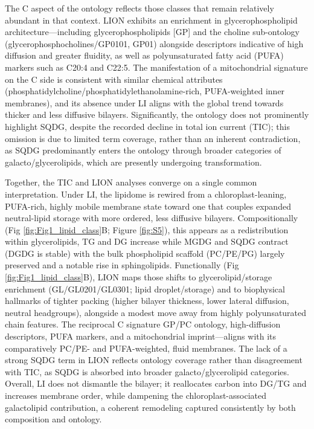 \documentclass[10pt,letterpaper]{article}
\begin{document}
The C aspect of the ontology reflects those classes that remain relatively abundant in that context. LION exhibits an enrichment in glycerophospholipid architecture—including glycerophospholipids [GP] and the choline sub-ontology (glycerophosphocholines/GP0101, GP01) alongside descriptors indicative of high diffusion and greater fluidity, as well as polyunsaturated fatty acid (PUFA) markers such as C20:4 and C22:5. The manifestation of a mitochondrial signature on the C side is consistent with similar chemical attributes (phosphatidylcholine/phosphatidylethanolamine-rich, PUFA-weighted inner membranes), and its absence under LI aligns with the global trend towards thicker and less diffusive bilayers. Significantly, the ontology does not prominently highlight SQDG, despite the recorded decline in total ion current (TIC); this omission is due to limited term coverage, rather than an inherent contradiction, as SQDG predominantly enters the ontology through broader categories of galacto/glycerolipids, which are presently undergoing transformation.

Together, the TIC and LION analyses converge on a single common interpretation. Under LI, the lipidome is rewired from a chloroplast-leaning, PUFA-rich, highly mobile membrane state toward one that couples expanded neutral-lipid storage with more ordered, less diffusive bilayers. Compositionally (Fig \ref{fig:Fig1_lipid_class}B; Figure \ref{fig:S5}), this appears as a redistribution within glycerolipids, TG and DG increase while MGDG and SQDG contract (DGDG is stable) with the bulk phospholipid scaffold (PC/PE/PG) largely preserved and a notable rise in sphingolipids. Functionally (Fig \ref{fig:Fig1_lipid_class}B), LION maps those shifts to glycerolipid/storage enrichment (GL/GL0201/GL0301; lipid droplet/storage) and to biophysical hallmarks of tighter packing (higher bilayer thickness, lower lateral diffusion, neutral headgroups), alongside a modest move away from highly polyunsaturated chain features. The reciprocal C signature GP/PC ontology, high-diffusion descriptors, PUFA markers, and a mitochondrial imprint—aligns with its comparatively PC/PE- and PUFA-weighted, fluid membranes. The lack of a strong SQDG term in LION reflects ontology coverage rather than disagreement with TIC, as SQDG is absorbed into broader galacto/glycerolipid categories. Overall, LI does not dismantle the bilayer; it reallocates carbon into DG/TG and increases membrane order, while dampening the chloroplast-associated galactolipid contribution, a coherent remodeling captured consistently by both composition and ontology.
\end{document}
